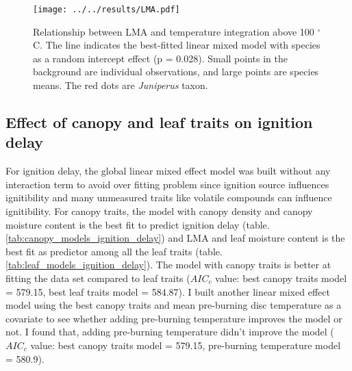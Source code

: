 \documentclass{ttuthes2007}
\begin{document}
\begin{figure}
    \centering
    \texttt{[image: ../../results/LMA.pdf]}
    \caption[short version]{\label{fig:LMA-tempint} Relationship between LMA and temperature integration above 100 $^{\circ}$C. The line indicates the best-fitted linear mixed model with species as a random intercept effect (p = 0.028). Small points in the background are individual observations, and large points are species means. The red dots are \emph{Juniperus} taxon.}
\end{figure}




\subsection{Effect of canopy and leaf traits on ignition delay}



For ignition delay, the global linear mixed effect model was built without any interaction term  to avoid over fitting problem since ignition source influences ignitibility \citep{madrigal2012evaluation} and many unmeasured traits like volatile compounds can influence ignitibility. For canopy traits, the model with canopy density and canopy moisture content is the best fit to predict ignition delay (table. \ref{tab:canopy_models_ignition_delay}) and LMA and leaf moisture content is the best fit as predictor among all the leaf traits (table. \ref{tab:leaf_models_ignition_delay}). The model with canopy traits is better at fitting the data set compared to leaf traits ($AIC_{c}$ value: best canopy traits model = 579.15, best leaf traits model = 584.87). I built another linear mixed effect model using the best canopy traits and  mean pre-burning disc temperature as a covariate to see whether adding pre-burning temperature improves the model or not. I found that, adding pre-burning temperature didn't improve the model ($AIC_{c}$ value: best canopy traits model = 579.15, pre-burning temperature model = 580.9).
\end{document}
